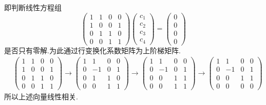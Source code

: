 ﻿\documentclass{book} \usepackage{exsheets} \usepackage{xeCJK}
\begin{document}
\begin{solution}
  即判断线性方程组
 $$ 
 \begin{pmatrix}
   1&1&0&0\\
   1&0&0&1\\
   0&1&1&0\\
   0&0&1&1
 \end{pmatrix}
 \begin{pmatrix}
   c_1\\
   c_2\\
   c_3\\
   c_4
 \end{pmatrix}=
 \begin{pmatrix}
   0\\
   0\\
   0\\
   0
 \end{pmatrix}
 $$
 是否只有零解.为此通过行变换化系数矩阵为上阶梯矩阵.
 \begin{align*}
   &\begin{pmatrix}
     1&1&0&0\\
     1&0&0&1\\
     0&1&1&0\\
     0&0&1&1
   \end{pmatrix}\to
            \begin{pmatrix}
              1&1&0&0\\
              0&-1&0&1\\
              0&1&1&0\\
              0&0&1&1
            \end{pmatrix}\to
                     \begin{pmatrix}
                       1&1&0&0\\
                       0&-1&0&1\\
                       0&0&1&1\\
                       0&0&1&1
                     \end{pmatrix}\to
                              \begin{pmatrix}
                                1&1&0&0\\
                                0&-1&0&1\\
                                0&0&1&1\\
                                0&0&0&0
                              \end{pmatrix}
 \end{align*}
 所以上述向量线性相关.
\end{solution}
\end{document}
